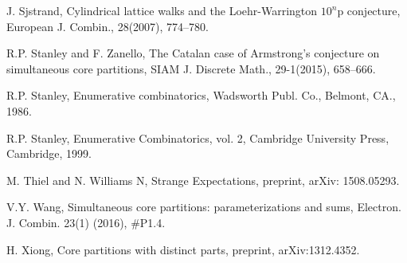 \documentclass[a4paper,12pt]{article}
\begin{document}
\begin{thebibliography}{99}
J. Sjstrand, Cylindrical lattice walks and the Loehr-Warrington $10^n$p conjecture, European J. Combin., 28(2007), 774--780.

R.P. Stanley and F. Zanello, The Catalan case of Armstrong's conjecture on simultaneous core partitions, SIAM J. Discrete Math., 29-1(2015), 658--666.


R.P. Stanley,  Enumerative combinatorics, Wadsworth Publ. Co., Belmont, CA., 1986.

R.P. Stanley, Enumerative Combinatorics, vol. 2, Cambridge University Press, Cambridge, 1999.


M. Thiel and N. Williams N, Strange Expectations, preprint, arXiv: 1508.05293.


V.Y.  Wang, Simultaneous core partitions: parameterizations and sums, Electron. J. Combin. 23(1) (2016), \#P1.4.

H. Xiong,  Core partitions with distinct parts,  preprint, arXiv:1312.4352.

\end{thebibliography}
\end{document}
